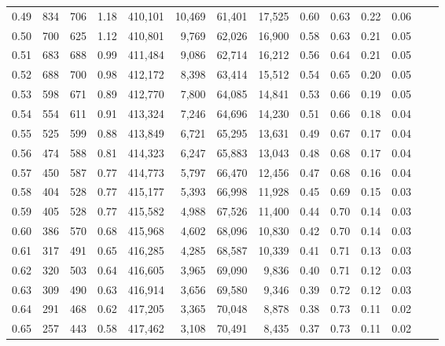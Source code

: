 \begin{tabular}{rrrrrrrrrrrrrr}
0.49 &     834 &    706 &    1.18 &  410,101 &   10,469 &  61,401 &  17,525 &  0.60 &  0.63 &  0.22 &      0.06 \\
0.50 &     700 &    625 &    1.12 &  410,801 &    9,769 &  62,026 &  16,900 &  0.58 &  0.63 &  0.21 &      0.05 \\
0.51 &     683 &    688 &    0.99 &  411,484 &    9,086 &  62,714 &  16,212 &  0.56 &  0.64 &  0.21 &      0.05 \\
0.52 &     688 &    700 &    0.98 &  412,172 &    8,398 &  63,414 &  15,512 &  0.54 &  0.65 &  0.20 &      0.05 \\
0.53 &     598 &    671 &    0.89 &  412,770 &    7,800 &  64,085 &  14,841 &  0.53 &  0.66 &  0.19 &      0.05 \\
0.54 &     554 &    611 &    0.91 &  413,324 &    7,246 &  64,696 &  14,230 &  0.51 &  0.66 &  0.18 &      0.04 \\
0.55 &     525 &    599 &    0.88 &  413,849 &    6,721 &  65,295 &  13,631 &  0.49 &  0.67 &  0.17 &      0.04 \\
0.56 &     474 &    588 &    0.81 &  414,323 &    6,247 &  65,883 &  13,043 &  0.48 &  0.68 &  0.17 &      0.04 \\
0.57 &     450 &    587 &    0.77 &  414,773 &    5,797 &  66,470 &  12,456 &  0.47 &  0.68 &  0.16 &      0.04 \\
0.58 &     404 &    528 &    0.77 &  415,177 &    5,393 &  66,998 &  11,928 &  0.45 &  0.69 &  0.15 &      0.03 \\
0.59 &     405 &    528 &    0.77 &  415,582 &    4,988 &  67,526 &  11,400 &  0.44 &  0.70 &  0.14 &      0.03 \\
0.60 &     386 &    570 &    0.68 &  415,968 &    4,602 &  68,096 &  10,830 &  0.42 &  0.70 &  0.14 &      0.03 \\
0.61 &     317 &    491 &    0.65 &  416,285 &    4,285 &  68,587 &  10,339 &  0.41 &  0.71 &  0.13 &      0.03 \\
0.62 &     320 &    503 &    0.64 &  416,605 &    3,965 &  69,090 &   9,836 &  0.40 &  0.71 &  0.12 &      0.03 \\
0.63 &     309 &    490 &    0.63 &  416,914 &    3,656 &  69,580 &   9,346 &  0.39 &  0.72 &  0.12 &      0.03 \\
0.64 &     291 &    468 &    0.62 &  417,205 &    3,365 &  70,048 &   8,878 &  0.38 &  0.73 &  0.11 &      0.02 \\
0.65 &     257 &    443 &    0.58 &  417,462 &    3,108 &  70,491 &   8,435 &  0.37 &  0.73 &  0.11 &      0.02 \\

\end{tabular}
